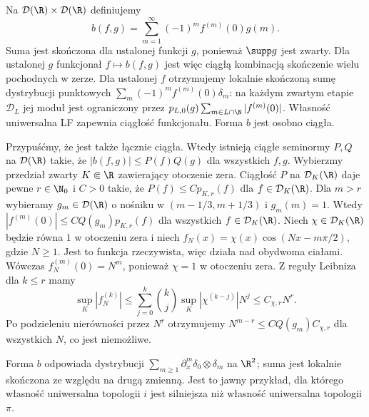 \begin{przyklad}
\label{ex:separate-not-joint24}
Na $\mathcal D(\R)\times\mathcal D(\R)$ definiujemy
\[
 b(f,g)=\sum_{m=1}^\infty (-1)^m f^{(m)}(0)g(m).
\]
Suma jest skończona dla ustalonej funkcji $g$, ponieważ
$\supp g$ jest zwarty. Dla ustalonej $g$ funkcjonał
$f\mapsto b(f,g)$ jest więc ciągłą kombinacją skończenie
wielu pochodnych w zerze. Dla ustalonej $f$ otrzymujemy
lokalnie skończoną sumę dystrybucji punktowych
$\sum_m(-1)^mf^{(m)}(0)\delta_m$: na każdym zwartym
etapie $\mathcal D_L$ jej moduł jest ograniczony przez
$p_{L,0}(g)\sum_{m\in L\cap\N}|f^{(m)}(0)|$.
Własność uniwersalna LF zapewnia ciągłość funkcjonału. Forma $b$ jest osobno ciągła.

Przypuśćmy, że jest także łącznie ciągła. Wtedy istnieją
ciągłe seminormy $P,Q$ na $\mathcal D(\R)$ takie, że
$|b(f,g)|\le P(f)Q(g)$ dla wszystkich $f,g$.
Wybierzmy przedział zwarty $K\Subset\R$ zawierający
otoczenie zera. Ciągłość $P$ na $\mathcal D_K(\R)$
daje pewne $r\in\N_0$ i $C>0$ takie, że
$P(f)\le Cp_{K,r}(f)$ dla $f\in\mathcal D_K(\R)$.
Dla $m>r$ wybieramy $g_m\in\mathcal D(\R)$ o nośniku
w $(m-1/3,m+1/3)$ i $g_m(m)=1$. Wtedy
$|f^{(m)}(0)|\le CQ(g_m)p_{K,r}(f)$ dla wszystkich
$f\in\mathcal D_K(\R)$. Niech $\chi\in\mathcal D_K(\R)$
będzie równa $1$ w otoczeniu zera i niech
$f_N(x)=\chi(x)\cos(Nx-m\pi/2)$, gdzie $N\ge1$.
Jest to funkcja rzeczywista, więc działa nad obydwoma
ciałami. Wówczas $f_N^{(m)}(0)=N^m$, ponieważ
$\chi=1$ w otoczeniu zera. Z reguły Leibniza
dla $k\le r$ mamy
\[
 \sup_K|f_N^{(k)}|
 \le\sum_{j=0}^k\binom{k}{j}\sup_K|\chi^{(k-j)}|N^j
 \le C_{\chi,r}N^r.
\]
Po podzieleniu nierówności przez $N^r$ otrzymujemy
$N^{m-r}\le C Q(g_m) C_{\chi,r}$ dla wszystkich $N$,
co jest niemożliwe.

Forma $b$ odpowiada dystrybucji
$\sum_{m\ge1}\partial_x^m\delta_0\otimes\delta_m$
na $\R^2$; suma jest lokalnie skończona ze względu
na drugą zmienną. Jest to jawny przykład, dla którego
własność uniwersalna topologii $i$ jest silniejsza
niż własność uniwersalna topologii $\pi$.
\end{przyklad}

